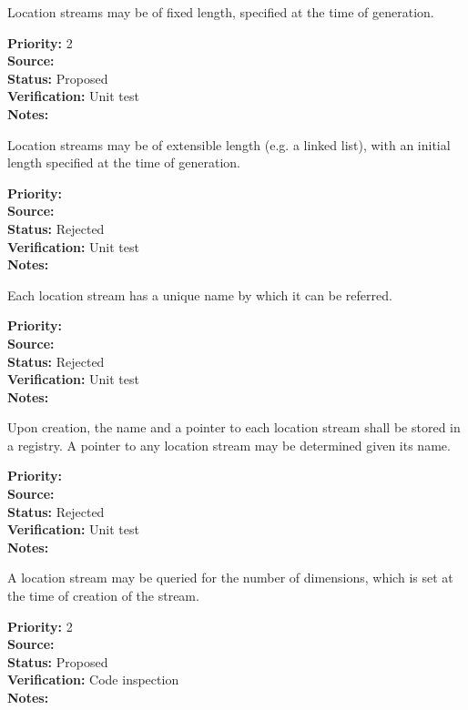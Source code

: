
Location streams may be of fixed length, specified at the time of generation.
\begin{reqlist}
{\bf Priority:} 2 \\
{\bf Source:} \\
{\bf Status:} Proposed \\
{\bf Verification:} Unit test\\
{\bf Notes:} 
\end{reqlist}

Location streams may be of extensible length (e.g. a linked list),
with an initial length specified at the time of generation.
\begin{reqlist}
{\bf Priority:} \\
{\bf Source:} \\
{\bf Status:} Rejected \\
{\bf Verification:} Unit test\\
{\bf Notes:} 
\end{reqlist}

Each location stream has a unique name by which it can be referred.
\begin{reqlist}
{\bf Priority:} \\
{\bf Source:} \\
{\bf Status:} Rejected \\
{\bf Verification:} Unit test \\
{\bf Notes:} 
\end{reqlist}

Upon creation, the name and a pointer to each location stream shall be stored in a
registry.  A pointer to any location stream may be determined given its name.
\begin{reqlist}
{\bf Priority:}  \\
{\bf Source:} \\
{\bf Status:} Rejected \\
{\bf Verification:} Unit test \\
{\bf Notes:} 
\end{reqlist}

A location stream may be queried for the number of dimensions, which is
set at the time of creation of the stream.
\begin{reqlist}
{\bf Priority:} 2 \\
{\bf Source:} \\
{\bf Status:} Proposed \\
{\bf Verification:} Code inspection \\
{\bf Notes:} 
\end{reqlist}

